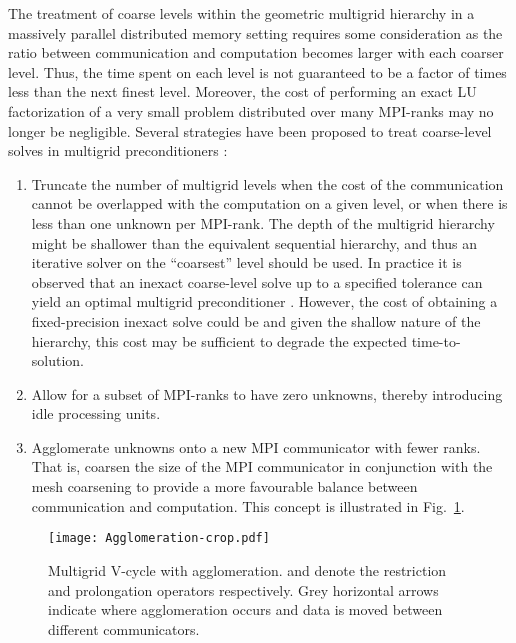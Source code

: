 \documentclass[]{siamart0216}
\begin{document}
The treatment of coarse levels within the geometric multigrid hierarchy in a massively parallel distributed memory setting
requires some consideration as the ratio 
between communication and computation becomes larger with each coarser level.
Thus, the time spent on each level is not guaranteed to be a factor of  times less 
than the next finest level. 
Moreover, the cost of performing an exact LU factorization of a 
very small problem distributed over many MPI-ranks may no longer be negligible. 
Several strategies have been proposed to treat coarse-level solves in multigrid preconditioners \cite{trottenberg2000multigrid}:
\begin{enumerate}
\setlength\itemsep{0em}
\item Truncate the number of multigrid levels when the cost of the communication cannot be 
overlapped with the computation on a given level, or when there is less than one unknown per MPI-rank. 
The depth of the multigrid hierarchy might be shallower than the equivalent sequential hierarchy, and thus 
an iterative solver on the ``coarsest'' level should be used. 
In practice it is observed that an inexact coarse-level solve up to a specified tolerance can yield an optimal 
multigrid preconditioner \cite{may2015scalable,trottenberg2000multigrid}. 
However, the cost of obtaining a fixed-precision inexact solve could be  
and given the shallow nature of the hierarchy, this cost may be sufficient to degrade the expected  time-to-solution.
\item Allow for a subset of MPI-ranks to have zero unknowns, thereby introducing idle processing units. 
\item Agglomerate unknowns onto a new MPI communicator with fewer ranks. 
That is, coarsen the size of the MPI communicator in conjunction with the mesh coarsening to provide 
a more favourable balance between communication and computation. 
This concept is illustrated in Fig.~\ref{fig:agglom}.
\end{enumerate}
\begin{figure}[h!]
\centering
\texttt{[image: Agglomeration-crop.pdf]}
\caption{Multigrid V-cycle with agglomeration.  and  denote the restriction and prolongation operators respectively. 
Grey horizontal arrows indicate where agglomeration occurs and data is moved between different communicators. \label{fig:agglom}}
\end{figure}
\end{document}
